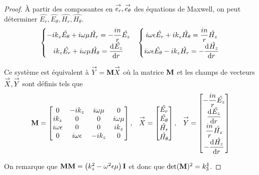   \begin{proof}
    À partir des composantes en \(\vect{e_r},\vect{e_\theta}\) des équations de Maxwell, on peut déterminer \(\hat{E_r},\hat{E_\theta},\hat{H_r},\hat{H_\theta}\).
    \begin{align*}
      \left\lbrace
      \begin{matrix}
        -ik_z\hat{E_\theta} + i\w\mu \hat{H_r} = -\frac{in}{r}\hat{E_z}
        \\
        ik_z\hat{E_r} + i\w\mu \hat{H_\theta} = \ddp{r}{\hat{E_z}}
      \end{matrix}
      \right.
      &&
      \left\lbrace
      \begin{matrix}
        i\w\eps \hat{E_r} + ik_z \hat{H_\theta} = \frac{in}{r}\hat{H_z}
        \\
        i\w\eps \hat{E_\theta} - ik_z \hat{H_r} = -\ddp{r}{\hat{H_z}}
      \end{matrix}
      \right.
    \end{align*}

    Ce système est équivalent à \(\vect{Y} = \mat{M}\vect{X}\) où la matrice \(\mat{M}\) et les champs de vecteurs \(\vect{X}, \vect{Y}\) sont définis tels que
    \begin{align*}
      \mat{M} =
      \begin{bmatrix}
      0 & -ik_z & i\w\mu & 0
      \\
      ik_z & 0 & 0 & i\w\mu
      \\
      i\w\eps & 0 & 0 & ik_z
      \\
      0 & i\w\eps & -ik_z & 0
      \end{bmatrix}
      ,&&
      \vect{X} =
      \begin{bmatrix}
        \hat{E_r}\\
        \hat{E_\theta}\\
        \hat{H_r}\\
        \hat{H_\theta}
      \end{bmatrix}
      ,&&
      \vect{Y} =
      \begin{bmatrix}
        -\frac{in}{r}\hat{E_z}\\
        \ddp{r}{\hat{E_z}}\\
        \frac{in}{r}\hat{H_z}\\
        -\ddp{r}{\hat{H_z}}
      \end{bmatrix}
    \end{align*}

    On remarque que \(\mM\mM = \left(k_z^2 - \omega^2\eps\mu\right)\mI\) et donc que \(\det(\mat{M})^2 = k_3^4\).


\end{proof}
